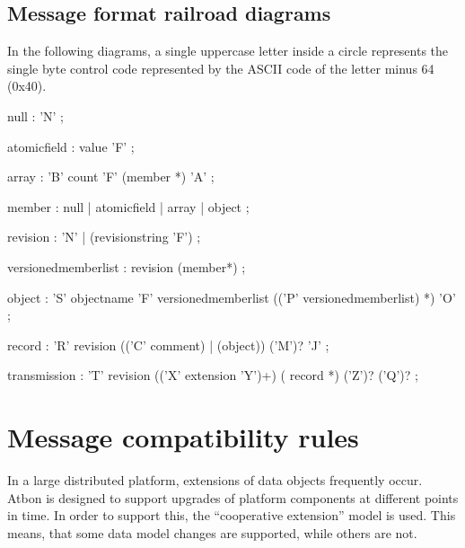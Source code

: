 \documentclass[11pt,a4paper,oneside]{article}
\begin{document}
\vspace{8mm}

\subsection{Message format railroad diagrams}
In the following diagrams, a single uppercase letter inside a circle represents the single byte control code represented by the ASCII code of the letter minus 64 (0x40).
 


\begin{rail}
null : 'N'
    ;
   
atomicfield : value 'F'
    ;
   
array :
    'B' count 'F' (member *) 'A'
    ;

member : null | atomicfield | array | object
    ;

revision : 'N' | (revisionstring 'F')
    ;
   
\end{rail}
        
\begin{rail}
versionedmemberlist :
    revision (member*)
    ;
\end{rail}
        
\begin{rail}
object :
    'S' objectname 'F' versionedmemberlist
          (('P' versionedmemberlist) *)
    'O'
    ;
\end{rail}
        
\begin{rail}
record :
    'R' revision
                          (('C' comment) | (object))
                                                    ('M')? 'J'
    ;
\end{rail}
        
\begin{rail}
transmission :
    'T' revision
    (('X' extension 'Y')+) 
    ( record *) 
    ('Z')?
    ('Q')?
    ;
\end{rail}

\vspace{8mm}


\section{Message compatibility rules}
In a large distributed platform, extensions of data objects frequently occur. Atbon is designed to support upgrades of platform
components at different points in time. In order to support this, the
``cooperative extension'' model is used. This means, that some data model changes are supported, while others are not.
\end{document}

